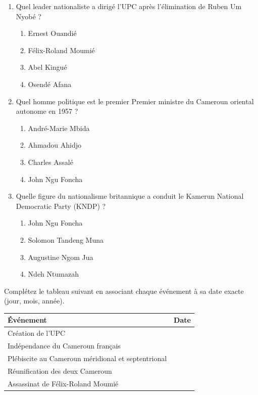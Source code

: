 \documentclass[11pt]{article}
\begin{document}
\begin{exercice}
\begin{enumerate}
    \item Quel leader nationaliste a dirigé l'UPC après l'élimination de Ruben Um Nyobé ?
    \begin{enumerate}
        \item Ernest Ouandié
        \item Félix-Roland Moumié
        \item Abel Kingué
        \item Osendé Afana
    \end{enumerate}
    \item Quel homme politique est le premier Premier ministre du Cameroun oriental autonome en 1957 ?
    \begin{enumerate}
        \item André-Marie Mbida
        \item Ahmadou Ahidjo
        \item Charles Assalé
        \item John Ngu Foncha
    \end{enumerate}
    \item Quelle figure du nationalisme britannique a conduit le Kamerun National Democratic Party (KNDP) ?
    \begin{enumerate}
        \item John Ngu Foncha
        \item Solomon Tandeng Muna
        \item Augustine Ngom Jua
        \item Ndeh Ntumazah
    \end{enumerate}
\end{enumerate}
\end{exercice}

\begin{exercice}
Complétez le tableau suivant en associant chaque événement à sa date exacte (jour, mois, année).

\begin{tabular}{|p{5.5cm}|p{3.5cm}|}
\hline
\textbf{Événement} & \textbf{Date} \\
\hline
Création de l'UPC & \\
\hline
Indépendance du Cameroun français & \\
\hline
Plébiscite au Cameroun méridional et septentrional & \\
\hline
Réunification des deux Cameroun & \\
\hline
Assassinat de Félix-Roland Moumié & \\
\hline
\end{tabular}
\end{exercice}
\end{document}
